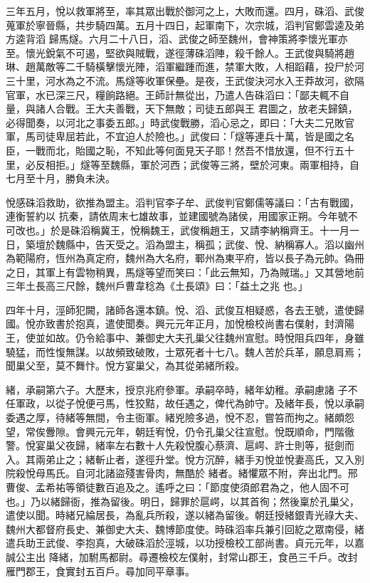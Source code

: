 \begin{pinyinscope}
 三年五月，悅以救軍將至，率其眾出戰於御河之上，大敗而還。四月，硃滔、武俊蒐軍於寧晉縣，共步騎四萬。五月十四日，起軍南下，次宗城，滔判官鄭雲逵及弟方逵背滔
 歸馬燧。六月二十八日，滔、武俊之師至魏州，會神策將李懷光軍亦至。懷光銳氣不可遏，堅欲與賊戰，遂徑薄硃滔陣，殺千餘人。王武俊與騎將趙琳、趙萬敵等二千騎橫擊懷光陣，滔軍繼踵而進，禁軍大敗，人相蹈藉，投尸於河三十里，河水為之不流。馬燧等收軍保壘。是夜，王武俊決河水入王莽故河，欲隔官軍，水已深三尺，糧餉路絕。王師計無從出，乃遣人告硃滔曰：「鄙夫輒不自量，與諸人合戰。王大夫善戰，天下無敵；司徒五郎與王
 君圖之，放老夫歸鎮，必得聞奏，以河北之事委五郎。」時武俊戰勝，滔心忌之，即曰：「大夫二兄敗官軍，馬司徒卑屈若此，不宜迫人於險也。」武俊曰：「燧等連兵十萬，皆是國之名臣，一戰而北，貽國之恥，不知此等何面見天子耶！然吾不惜放還，但不行五十里，必反相拒。」燧等至魏縣，軍於河西；武俊等三將，壁於河東。兩軍相持，自七月至十月，勝負未決。



 悅感硃滔救助，欲推為盟主。滔判官李子牟、武俊判官鄭儒等議曰：「古有戰國，連衡誓約以
 抗秦，請依周末七雄故事，並建國號為諸侯，用國家正朔。今年號不可改也。」於是硃滔稱冀王，悅稱魏王，武俊稱趙王，又請李納稱齊王。十一月一日，築壇於魏縣中，告天受之。滔為盟主，稱孤；武俊、悅、納稱寡人。滔以幽州為範陽府，恆州為真定府，魏州為大名府，鄆州為東平府，皆以長子為元帥。偽冊之日，其軍上有雲物稍異，馬燧等望而笑曰：「此云無知，乃為賊瑞。」又其營地前三年土長高三尺餘，魏州戶曹韋稔為《土長頌》曰：「益土之兆
 也。」



 四年十月，涇師犯闕，諸師各還本鎮。悅、滔、武俊互相疑惑，各去王號，遣使歸國。悅亦致書於抱真，遣使聞奏。興元元年正月，加悅檢校尚書右僕射，封濟陽王，使並如故。仍令給事中、兼御史大夫孔巢父往魏州宣慰。時悅阻兵四年，身雖驍猛，而性愎無謀。以故頻致破敗，士眾死者十七八。魏人苦於兵革，願息肩焉；聞巢父至，莫不舞忭。悅方宴巢父，為其從弟緒所殺。



 緒，承嗣第六子。大歷末，授京兆府參軍。承嗣卒時，緒年幼稚。承嗣慮諸
 子不任軍政，以從子悅便弓馬，性狡黠，故任遇之，俾代為帥守。及緒年長，悅以承嗣委遇之厚，待緒等無間，令主衙軍。緒兇險多過，悅不忍，嘗笞而拘之。緒頗怨望，常俟釁隙。會興元元年，朝廷宥悅，仍令孔巢父往宣慰。悅既順命，門階徹警。悅宴巢父夜歸，緒率左右數十人先殺悅腹心蔡濟、扈崿、許士則等，挺劍而入。其兩弟止之；緒斬止者，遂徑升堂。悅方沉醉，緒手刃悅並悅妻高氏，又入別院殺悅母馬氏。自河北諸盜殘害骨肉，無酷於
 緒者。緒懼眾不附，奔出北門。邢曹俊、孟希祐等領徒數百追及之。遙呼之曰：「節度使須郎君為之，他人固不可也。」乃以緒歸衙，推為留後。明日，歸罪於扈崿，以其首徇；然後稟於孔巢父，遣使以聞。時緒兄綸居長，為亂兵所殺，遂以緒為留後。朝廷授緒銀青光祿大夫、魏州大都督府長史、兼御史大夫、魏博節度使。時硃滔率兵兼引回紇之眾南侵，緒遣兵助王武俊、李抱真，大破硃滔於涇城，以功授檢校工部尚書。貞元元年，以嘉誠公主出
 降緒，加駙馬都尉。尋遷檢校左僕射，封常山郡王，食邑三千戶。改封雁門郡王，食實封五百戶。尋加同平章事。




\end{pinyinscope}
